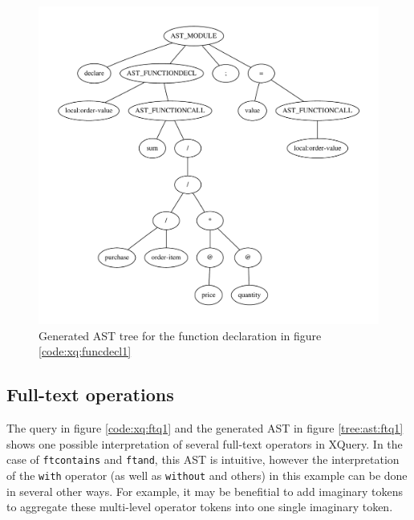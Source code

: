 \pagebreak
\begin{figure}[h!]

\caption{Function declaration used to generate the AST in figure
\ref{tree:ast:funcdecl1}}
\label{code:xq:funcdecl1}
\centering
 \includegraphics[width=1\textwidth]{img/graphs/funcdecl1}
\caption{Generated AST tree for the function declaration in figure \ref{code:xq:funcdecl1}}
\label{tree:ast:funcdecl1}
\end{figure}

\subsection{Full-text operations}
The query in figure \ref{code:xq:ftq1} and the generated AST in figure
\ref{tree:ast:ftq1} shows one possible interpretation of several full-text 
operators in XQuery. In the case of \verb!ftcontains! and \verb!ftand!, this AST
is intuitive, however the interpretation of the \verb!with! operator (as well
as \verb!without! and others) in this example can be done in several other ways.
For example, it may be benefitial to add imaginary tokens to aggregate these
multi-level operator tokens into one single imaginary token.

